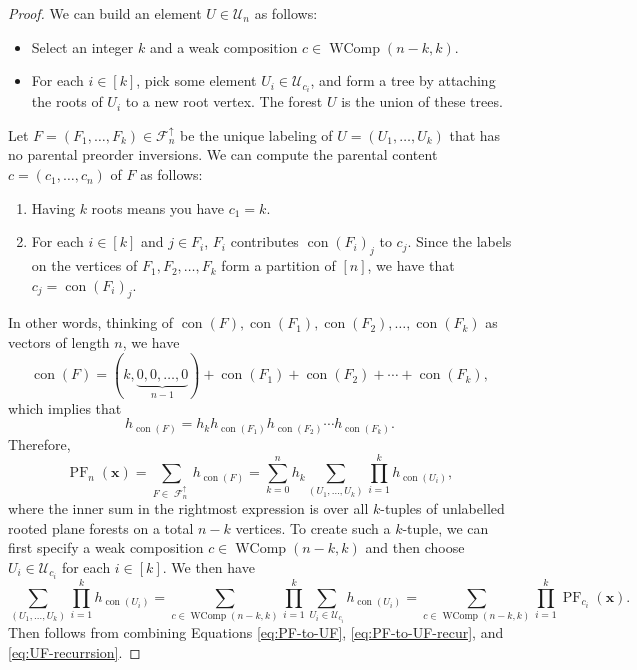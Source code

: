 \documentclass{amsart}
\DeclareMathOperator{\PF}{PF}
\DeclareMathOperator{\WComp}{WComp}
\DeclareMathOperator{\con}{con}
\DeclareMathOperator{\F}{\mathcal{F}}
\theoremstyle{definition}
\begin{document}
\begin{proof}
    
    We can build an element $U\in \mathcal{U}_n$ as follows:
    \begin{itemize}
        \item Select an integer $k$ and a weak composition $c\in \WComp(n-k,k)$.
        \item For each $i\in [k]$, pick some element $U_i\in \mathcal{U}_{c_i}$, and form a tree by attaching the roots of $U_i$ to a new root vertex. 
        The forest $U$ is the union of these trees.
    \end{itemize} 
    Let  $F=(F_1,\dots,F_k)\in \mathcal{F}_n^{\uparrow}$ be the unique labeling of $U=(U_1,\dots, U_k)$ that has no parental preorder inversions. We can compute the parental content $c=(c_1,\dots,c_n)$
    of $F$ as follows: 
    \begin{enumerate}
        \item Having $k$ roots means you have $c_1=k$.
        \item  For each $i\in [k]$ and $j\in F_i$, $F_i$ contributes $\con(F_i)_j$ to $c_j$. Since the labels on the vertices of $F_1,F_2,\dots,F_k$ form a partition of $[n]$, we have that $c_j=\con(F_i)_j$. 
    \end{enumerate}
    In other words, thinking of $\con(F), \con(F_1),\con(F_2),\dots,\con(F_k)$ as vectors of  length $n$, we have
        \[\con(F)=(k,\underbrace{0,0,\dots,0}_{n-1})+\con(F_1)+\con(F_2)+\cdots + \con(F_k),\]
        which implies that 
        \begin{equation}h_{\con(F)}=h_k h_{\con(F_1)}h_{\con(F_2)}\cdots h_{\con(F_k)}.\end{equation}
        Therefore, 
        \begin{equation}\label{eq:PF-to-UF-recur}\PF_n(\mathbf{x})=\sum_{F\in \F^{\uparrow}_n} h_{\con(F)}=\sum_{k=0}^n h_{k}\sum_{(U_1,\dots,U_k)}\prod_{i=1}^k {h}_{\con(U_i)},\end{equation}
        where the inner sum in the rightmost expression is over all $k$-tuples of unlabelled rooted plane forests on a total $n-k$ vertices. 
        To create such a $k$-tuple, we can first specify a weak composition $c\in \WComp(n-k,k)$ and then choose $U_i\in \mathcal{U}_{c_i}$ for each $i\in [k].$ 
        We then have 
        \begin{equation}\label{eq:UF-recurrsion}\sum_{(U_1,\dots,U_k)}\prod_{i=1}^k {h}_{\con(U_i)}=\sum_{c\in \WComp(n-k,k)}\prod_{i=1}^k\sum_{U_i\in \mathcal{U}_{c_i}}{h}_{\con(U_i)}
   =\sum_{c\in \WComp(n-k,k)}\prod_{i=1}^k \PF_{c_{i}}(\mathbf{x}).\end{equation}
        Then   follows from combining Equations \eqref{eq:PF-to-UF}, \eqref{eq:PF-to-UF-recur}, and \eqref{eq:UF-recurrsion}.
\end{proof}
\end{document}
